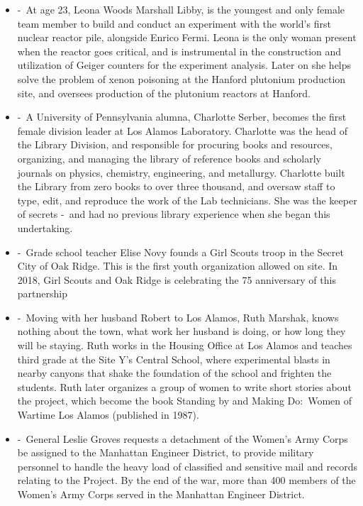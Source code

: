 \documentclass[12pt,a4paper]{article}
\begin{document}
\begin{enumerate}
\begin{itemize}
      \item[]  -\ At age 23, Leona Woods Marshall Libby, is the youngest and only female team member to build and conduct an experiment with the world's first nuclear reactor pile, alongside Enrico Fermi. Leona is the only woman present when the reactor goes critical, and is instrumental in the construction and utilization of Geiger counters for the experiment analysis. Later on she helps solve the problem of xenon poisoning at the Hanford plutonium production site, and oversees production of the plutonium reactors at Hanford.
      \item[]  -\ A University of Pennsylvania alumna, Charlotte Serber, becomes the first female division leader at Los Alamos Laboratory. Charlotte was the head of the Library Division, and responsible for procuring books and resources, organizing, and managing the library of reference books and scholarly journals on physics, chemistry, engineering, and metallurgy. Charlotte built the Library from zero books to over three thousand, and oversaw staff to type, edit, and reproduce the work of the Lab technicians. She was the keeper of secrets -\ and had no previous library experience when she began this undertaking.
      \item[]  -\ Grade school teacher Elise Novy founds a Girl Scouts troop in the Secret City of Oak Ridge. This is the first youth organization allowed on site. In 2018, Girl Scouts and Oak Ridge is celebrating the 75 anniversary of this partnership
      \item[]  -\ Moving with her husband Robert to Los Alamos, Ruth Marshak, knows nothing about the town, what work her husband is doing, or how long they will be staying. Ruth works in the Housing Office at Los Alamos and teaches third grade at the Site Y's Central School, where experimental blasts in nearby canyons that shake the foundation of the school and frighten the students. Ruth later organizes a group of women to write short stories about the project, which become the book Standing by and Making Do:\ Women of Wartime Los Alamos (published in 1987).
      \item[]  -\ General Leslie Groves requests a detachment of the Women's Army Corps be assigned to the Manhattan Engineer District, to provide military personnel to handle the heavy load of classified and sensitive mail and records relating to the Project. By the end of the war, more than 400 members of the Women's Army Corps served in the Manhattan Engineer District.

\end{itemize}
\end{enumerate}
\end{document}
